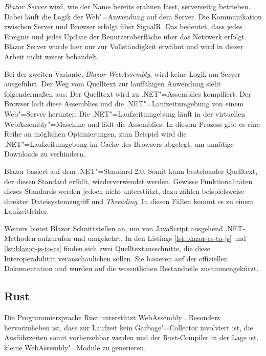 \emph{Blazor Server} wird, wie der Name bereits erahnen lässt, serverseitig betrieben. Dabei läuft die Logik der Web"=Anwendung auf dem Server. Die Kommunikation zwischen Server und Browser erfolgt über SignalR. Das bedeutet, dass jedes Ereignis und jedes Update der Benutzeroberfläche über das Netzwerk erfolgt. Blazor Server wurde hier nur zur Vollständigkeit erwähnt und wird in dieser Arbeit nicht weiter behandelt.

Bei der zweiten Variante, \emph{Blazor WebAssembly}, wird keine Logik am Server ausgeführt. Der Weg vom Quelltext zur lauffähigen Anwendung sieht folgendermaßen aus: Der Quelltext wird zu .NET"=Assemblies kompiliert. Der Browser lädt diese Assemblies und die .NET"=Laufzeitumgebung von einem Web"=Server herunter. Die .NET"=Laufzeitumgebung läuft in der virtuellen WebAssembly"=Maschine und lädt die Assemblies. In diesem Prozess gibt es eine Reihe an möglichen Optimierungen, zum Beispiel wird die .NET"=Laufzeitumgebung im Cache des Browsers abgelegt, um unnötige Downloads zu verhindern.

Blazor basiert auf dem .NET"=Standard 2.0. Somit kann bestehender Quelltext, der diesen Standard erfüllt, wiederverwendet werden. Gewisse Funktionalitäten dieses Standards werden jedoch nicht unterstützt, dazu zählen beispielsweise direkter Dateisystemzugriff und \emph{Threading}. In diesen Fällen kommt es zu einem Laufzeitfehler.

Weiters bietet Blazor Schnittstellen an, um von JavaScript ausgehend .NET-Methoden aufzurufen und umgekehrt. In den Listings \ref{lst:blazor-cs-to-js} und \ref{lst:blazor-js-to-cs} finden sich zwei Quelltextausschnitte, die diese Interoperabilität veranschaulichen sollen. Sie basieren auf der offiziellen Dokumentation und wurden auf die wesentlichen Bestandteile zusammengekürzt.

\pagebreak




\subsection{Rust}

Die Programmiersprache Rust unterstützt WebAssembly \cite{RustWasmWebsite}. Besonders hervorzuheben ist, dass zur Laufzeit kein Garbage"=Collector involviert ist, die Ausführzeiten somit vorhersehbar werden und der Rust-Compiler in der Lage ist, kleine WebAssembly"=Module zu generieren.

